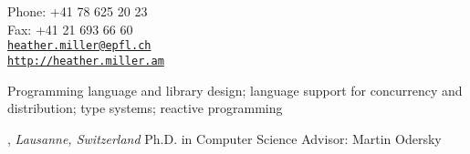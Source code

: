 \documentclass[9pt]{article}
\makeatletter
\def\myemail{heather.miller@epfl.ch}
\def\myweb{http://heather.miller.am}
\def\myfax{+41 21 693 66 60}
\def\myphone{+41 78 625 20 23}
\makeatother
\begin{document}
\begin{minipage}[t]{2.95in}

\end{minipage}
\hfill
\hfill
\begin{minipage}[t]{1.7in}
  \flushright \footnotesize Phone: \myphone \\
  Fax: \myfax  \\
  {\scriptsize  \texttt{\href{mailto:\myemail}{\myemail}}} \\
  {\scriptsize  \vspace{-0.03in} \texttt{\href{\myweb}{\myweb}}}
\end{minipage}


\medskip


\bigskip


\noindent Programming language and library design; language support for concurrency and distribution; type systems; reactive programming

\bigskip


, \emph{Lausanne, Switzerland} \vspace{0.01in} 
\newline Ph.D. in Computer Science
\newline Advisor: Martin Odersky 
\medskip
\end{document}
